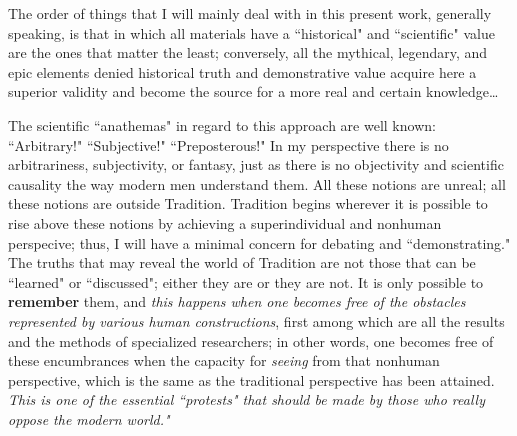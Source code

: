 \begin{quotex}
The order of things that I will mainly deal with in this present work, generally speaking, is that in which all materials have a ``historical" and ``scientific" value are the ones that matter the least; conversely, all the mythical, legendary, and epic elements denied historical truth and demonstrative value acquire here a superior validity and become the source for a more real and certain knowledge…

The scientific ``anathemas" in regard to this approach are well known: ``Arbitrary!" ``Subjective!" ``Preposterous!" In my perspective there is no arbitrariness, subjectivity, or fantasy, just as there is no objectivity and scientific causality the way modern men understand them. All these notions are unreal; all these notions are outside Tradition. Tradition begins wherever it is possible to rise above these notions by achieving a superindividual and nonhuman perspecive; thus, I will have a minimal concern for debating and ``demonstrating." The truths that may reveal the world of Tradition are not those that can be ``learned" or ``discussed"; either they are or they are not. It is only possible to \textbf{remember} them, and \emph{this happens when one becomes free of the obstacles represented by various human constructions}, first among which are all the results and the methods of specialized researchers; in other words, one becomes free of these encumbrances when the capacity for \emph{seeing} from that nonhuman perspective, which is the same as the traditional perspective has been attained. \emph{This is one of the essential ``protests" that should be made by those who really oppose the modern world."}

\end{quotex}

